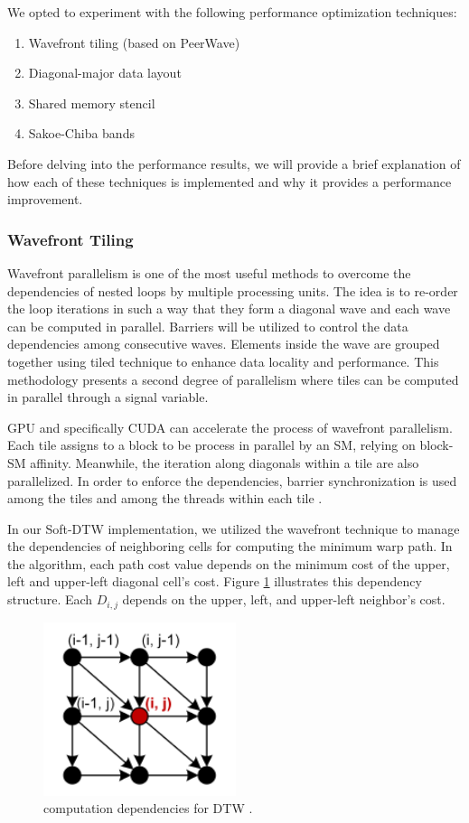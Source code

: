 \documentclass[12pt, letterpaper]{article}
\begin{document}
We opted to experiment with the following performance optimization techniques:

\begin{enumerate}
\item Wavefront tiling (based on PeerWave)
\item Diagonal-major data layout
\item Shared memory stencil
\item Sakoe-Chiba bands
\end{enumerate}

Before delving into the performance results, we will provide a brief explanation
of how each of these techniques is implemented and why it provides a performance
improvement.

\subsubsection{Wavefront Tiling}
Wavefront parallelism is one of the most useful methods to overcome the
dependencies of nested loops by multiple processing units. The idea is to
re-order the loop iterations in such a way that they form a diagonal wave and
each wave can be computed in parallel. Barriers will be utilized to control the
data dependencies among consecutive waves. Elements inside the wave are grouped
together using tiled technique to enhance data locality and performance. This
methodology presents a second degree of parallelism where tiles can be computed
in parallel through a signal variable.

GPU and specifically CUDA can accelerate the process of wavefront
parallelism. Each tile assigns to a block to be process in parallel by an SM,
relying on block-SM affinity. Meanwhile, the iteration along diagonals within a
tile are also parallelized. In order to enforce the dependencies, barrier
synchronization is used among the tiles and among the threads within each tile
\cite{belviranli_peerwave_2015}.

In our Soft-DTW implementation, we utilized the wavefront technique to manage
the dependencies of neighboring cells for computing the minimum warp path. In
the algorithm, each path cost value depends on the minimum cost of the upper,
left and upper-left diagonal cell's cost. Figure \ref{DTW_dependency}
illustrates this dependency structure. Each $D_{i,j}$ depends on the upper,
left, and upper-left neighbor's cost.

\begin{figure}[htbp]
\includegraphics[height=2in]{img/tiling_dependencies.png}
\centering
\caption{computation dependencies for DTW \cite{belviranli_peerwave_2015}.}
\label{DTW_dependency}
\end{figure}
\end{document}
